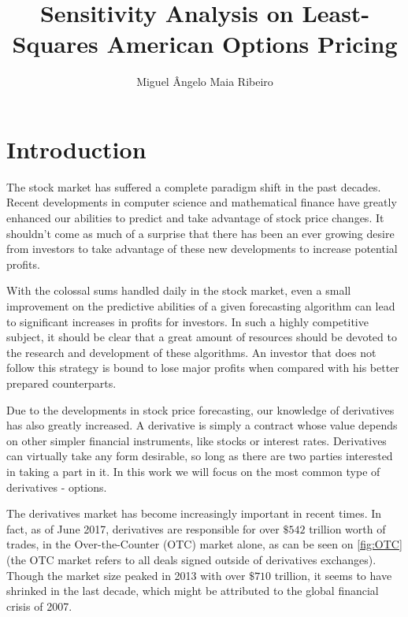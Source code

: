 \documentclass[a4paper,prd,twocolumn,nofootinbib,superscriptaddress,floatfix]{revtex4}
\begin{document}
\title{Sensitivity Analysis on Least-Squares American Options Pricing}

\author{Miguel Ângelo Maia Ribeiro}




\maketitle
\section{Introduction}
The stock market has suffered a complete paradigm shift in the past decades. Recent developments in computer science and mathematical finance have greatly enhanced our abilities to predict and take advantage of stock price changes. It shouldn't come as much of a surprise that there has been an ever growing desire from investors to take advantage of these new developments to increase potential profits.

With the colossal sums handled daily in the stock market, even a small improvement on the predictive abilities of a given forecasting algorithm can lead to significant increases in profits for investors. In such a highly competitive subject, it should be clear that a great amount of resources should be devoted to the research and development of these algorithms. An investor that does not follow this strategy is bound to lose major profits when compared with his better prepared counterparts.




Due to the developments in stock price forecasting, our knowledge of derivatives has also greatly increased. A derivative is simply a contract whose value depends on other simpler financial instruments, like stocks or interest rates. Derivatives can virtually take any form desirable, so long as there are two parties interested in taking a part in it. In this work we will focus on the most common type of derivatives - options.

The derivatives market has become increasingly important in recent times. In fact, as of June 2017, derivatives are responsible for over $\$542$ trillion worth of trades, in the Over-the-Counter (OTC) market alone, as can be seen on \autoref{fig:OTC} (the OTC market refers to all deals signed outside of derivatives exchanges). Though the market size peaked in 2013 with over $\$710$ trillion, it seems to have shrinked in the last decade, which might be attributed to the global financial crisis of 2007.
\end{document}
